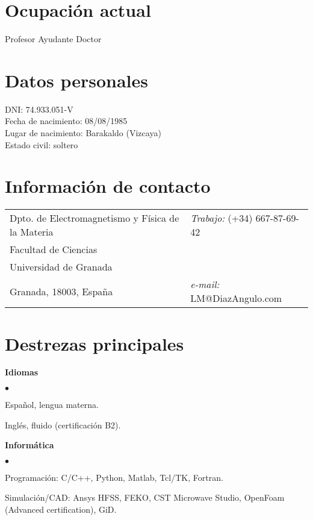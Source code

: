 \documentclass[a4paper,margin,line]{res}
\newenvironment{list2}{
  \begin{list}{$\bullet$}{%
      \setlength{\itemsep}{0in}
      \setlength{\parsep}{0in} \setlength{\parskip}{0in}
      \setlength{\topsep}{0in} \setlength{\partopsep}{0in} 
      \setlength{\leftmargin}{0.2in}}}{\end{list}}
\begin{document}

\begin{resume}
\section{\sc Ocupación actual}
 Profesor Ayudante Doctor
 
\section{\sc Datos personales}
DNI: 74.933.051-V\\
Fecha de nacimiento: 08/08/1985\\
Lugar de nacimiento: Barakaldo (Vizcaya)\\
Estado civil: soltero
 
\section{\sc Información de contacto}
\vspace{.05in}
\begin{tabular}{@{}p{3.1in}p{4in}}
Dpto. de Electromagnetismo y Física de la Materia  & {\it Trabajo:}  (+34) 667-87-69-42 \\            
Facultad de Ciencias             & \\         
Universidad de Granada            & \\
Granada, 18003, España            &{\it e-mail:}  LM@DiazAngulo.com
\end{tabular}



\section{\sc Destrezas principales} 
 {\bf Idiomas}
  \begin{list2}
   \item Español, lengua materna.
   \item Inglés, fluido (certificación B2).
  \end{list2}
 {\bf Informática}
 \begin{list2} 
  \item Programación:  C/C++, Python, Matlab, Tcl/TK, Fortran.
  \item Simulación/CAD: Ansys HFSS, FEKO, CST Microwave Studio, OpenFoam (Advanced certification), GiD.
  \end{list2}


\end{resume}
\end{document}
